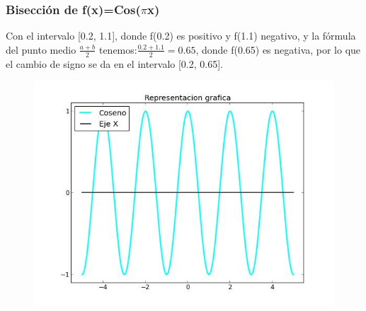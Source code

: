 \documentclass{beamer}
\begin{document}
\begin{frame}
\frametitle{Bisección de f(x)=Cos($\pi$x)}

\begin{block}{}
Con el intervalo [0.2, 1.1], donde f(0.2) es positivo y f(1.1) negativo, y la fórmula del punto medio $\frac{a+b}{2}$ tenemos:$\frac{0.2+1.1}{2}=0.65$, donde f(0.65) es negativa, por lo que el cambio de signo se da en el intervalo [0.2, 0.65].
\end{block}

\begin{figure}[b]
\begin{center}
\includegraphics[scale=0.4]{cos.jpeg}
\end{center}
\end{figure}

\end{frame}
\end{document}
